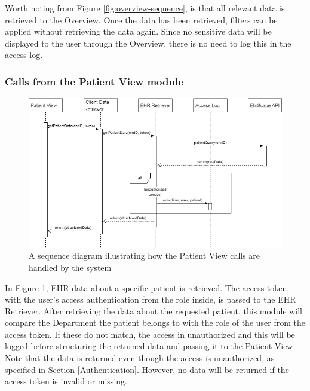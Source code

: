 \documentclass{article}
\begin{document}
Worth noting from Figure \ref{fig:overview-sequence}, is that all relevant data is retrieved to the Overview. Once the data has been retrieved, filters can be applied without retrieving the data again. Since no sensitive data will be displayed to the user through the Overview, there is no need to log this in the access log.

\subsubsection{Calls from the Patient View module}
\begin{figure}[h]
    \centering
    \includegraphics[scale = 0.45]{patient-sequence}
    \caption{A sequence diagram illustrating how the Patient View calls are handled by the system}
    \label{fig:patient-sequence}
\end{figure}

In Figure \ref{fig:patient-sequence}, EHR data about a specific patient is retrieved. The access token, with the user's access authentication from the role inside, is passed to the EHR Retriever. After retrieving the data about the requested patient, this module will compare the Department the patient belongs to with the role of the user from the access token. If these do not match, the access in unauthorized and this will be logged before structuring the returned data and passing it to the Patient View. Note that the data is returned even though the access is unauthorized, as specified in Section \ref{Authentication}. However, no data will be returned if the access token is invalid or missing.
\end{document}
